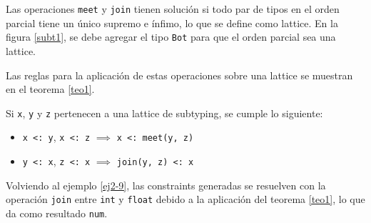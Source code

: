 Las operaciones \texttt{meet} y \texttt{join} tienen solución si todo par de tipos en el orden parcial tiene un único supremo e ínfimo, lo que se define como lattice. En la figura \ref{subt1}, se debe agregar el tipo \texttt{Bot} para que el orden parcial sea una lattice.

Las reglas para la aplicación de estas operaciones sobre una lattice se muestran en el teorema \ref{teo1}.

\begin{teo} \label{teo1} \normalfont Si \texttt{x}, \texttt{y} y \texttt{z} pertenecen a una lattice de subtyping, se cumple lo siguiente: \\
  \begin{itemize}
    \item \texttt{x <: y}, \texttt{x <: z} $\implies$ \texttt{x <: meet(y, z)}
    \item \texttt{y <: x}, \texttt{z <: x} $\implies$ \texttt{join(y, z) <: x}
  \end{itemize}
\end{teo}

Volviendo al ejemplo \ref{ej2-9}, las constraints generadas se resuelven con la operación \texttt{join} entre \texttt{int} y \texttt{float} debido a la aplicación del teorema \ref{teo1}, lo que da como resultado \texttt{num}.


